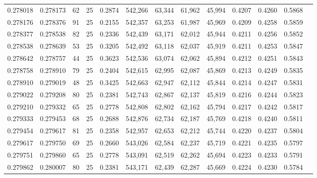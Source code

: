 \begin{tabular}{rrrrrrrrrrrrr}
0.278018 & 0.278173 &    62 &  25 &                                     0.2874 & 542,266 &  63,344 &  61,962 &  45,994 & 0.4207 & 0.4260 & 0.5868 \\
0.278176 & 0.278376 &    91 &  25 &                                     0.2155 & 542,357 &  63,253 &  61,987 &  45,969 & 0.4209 & 0.4258 & 0.5859 \\
0.278377 & 0.278538 &    82 &  25 &                                     0.2336 & 542,439 &  63,171 &  62,012 &  45,944 & 0.4211 & 0.4256 & 0.5852 \\
0.278538 & 0.278639 &    53 &  25 &                                     0.3205 & 542,492 &  63,118 &  62,037 &  45,919 & 0.4211 & 0.4253 & 0.5847 \\
0.278642 & 0.278757 &    44 &  25 &                                     0.3623 & 542,536 &  63,074 &  62,062 &  45,894 & 0.4212 & 0.4251 & 0.5843 \\
0.278758 & 0.278910 &    79 &  25 &                                     0.2404 & 542,615 &  62,995 &  62,087 &  45,869 & 0.4213 & 0.4249 & 0.5835 \\
0.278910 & 0.279019 &    48 &  25 &                                     0.3425 & 542,663 &  62,947 &  62,112 &  45,844 & 0.4214 & 0.4247 & 0.5831 \\
0.279022 & 0.279208 &    80 &  25 &                                     0.2381 & 542,743 &  62,867 &  62,137 &  45,819 & 0.4216 & 0.4244 & 0.5823 \\
0.279210 & 0.279332 &    65 &  25 &                                     0.2778 & 542,808 &  62,802 &  62,162 &  45,794 & 0.4217 & 0.4242 & 0.5817 \\
0.279333 & 0.279453 &    68 &  25 &                                     0.2688 & 542,876 &  62,734 &  62,187 &  45,769 & 0.4218 & 0.4240 & 0.5811 \\
0.279454 & 0.279617 &    81 &  25 &                                     0.2358 & 542,957 &  62,653 &  62,212 &  45,744 & 0.4220 & 0.4237 & 0.5804 \\
0.279617 & 0.279750 &    69 &  25 &                                     0.2660 & 543,026 &  62,584 &  62,237 &  45,719 & 0.4221 & 0.4235 & 0.5797 \\
0.279751 & 0.279860 &    65 &  25 &                                     0.2778 & 543,091 &  62,519 &  62,262 &  45,694 & 0.4223 & 0.4233 & 0.5791 \\
0.279862 & 0.280007 &    80 &  25 &                                     0.2381 & 543,171 &  62,439 &  62,287 &  45,669 & 0.4224 & 0.4230 & 0.5784 \\

\end{tabular}

